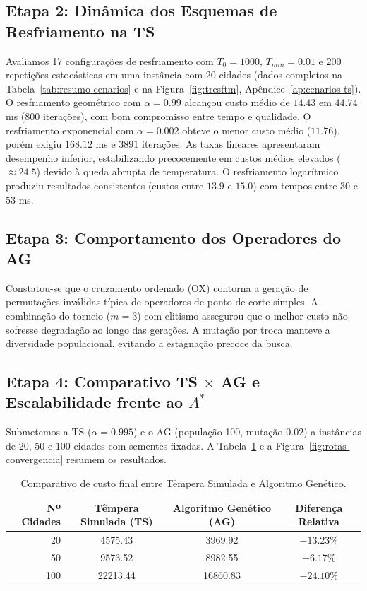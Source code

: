 \documentclass[11pt]{article}
\begin{document}
\subsection{Etapa 2: Dinâmica dos Esquemas de Resfriamento na TS}
Avaliamos 17 configurações de resfriamento com $T_0 = 1000$, $T_{min} = 0.01$ e 200 repetições estocásticas em uma instância com 20 cidades (dados completos na Tabela~\ref{tab:resumo-cenarios} e na Figura~\ref{fig:tresftm}, Apêndice~\ref{ap:cenarios-ts}).
O resfriamento geométrico com $\alpha = 0.99$ alcançou custo médio de $14.43$ em $44.74$ ms ($800$ iterações), com bom compromisso entre tempo e qualidade.
O resfriamento exponencial com $\alpha = 0.002$ obteve o menor custo médio ($11.76$), porém exigiu $168.12$ ms e $3891$ iterações.
As taxas lineares apresentaram desempenho inferior, estabilizando precocemente em custos médios elevados ($\approx 24.5$) devido à queda abrupta de temperatura.
O resfriamento logarítmico produziu resultados consistentes (custos entre $13.9$ e $15.0$) com tempos entre $30$ e $53$ ms.

\subsection{Etapa 3: Comportamento dos Operadores do AG}
Constatou-se que o cruzamento ordenado (OX) contorna a geração de permutações inválidas típica de operadores de ponto de corte simples. A combinação do torneio ($m=3$) com elitismo assegurou que o melhor custo não sofresse degradação ao longo das gerações. A mutação por troca manteve a diversidade populacional, evitando a estagnação precoce da busca.

\subsection{Etapa 4: Comparativo TS $\times$ AG e Escalabilidade frente ao $A^*$}
Submetemos a TS ($\alpha=0.995$) e o AG (população 100, mutação $0.02$) a instâncias de 20, 50 e 100 cidades com sementes fixadas. A Tabela~\ref{tab:resultados-comparativo} e a Figura~\ref{fig:rotas-convergencia} resumem os resultados.

\begin{table}[H]
\centering
\footnotesize
\caption{Comparativo de custo final entre Têmpera Simulada e Algoritmo Genético.}
\label{tab:resultados-comparativo}
\begin{tabular}{rccc}
\toprule
\textbf{Nº Cidades} & \textbf{Têmpera Simulada (TS)} & \textbf{Algoritmo Genético (AG)} & \textbf{Diferença Relativa} \\ 
\midrule
20  & 4575.43 & 3969.92 & $-13.23\%$ \\
50  & 9573.52 & 8982.55 & $-6.17\%$ \\
100 & 22213.44 & 16860.83 & $-24.10\%$ \\ 
\bottomrule
\end{tabular}
\end{table}
\end{document}
